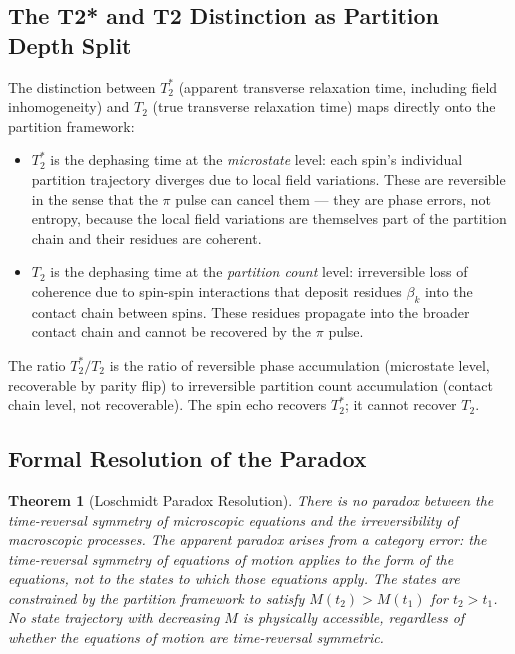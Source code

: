 \documentclass[11pt,twocolumn,a4paper]{article}
\theoremstyle{plain}
\newtheorem{theorem}{Theorem}[section]
\theoremstyle{definition}
\theoremstyle{remark}
\begin{document}
\subsection{The T2* and T2 Distinction as Partition Depth Split}
\label{subsec:T2_split}

The distinction between $T_2^*$ (apparent transverse relaxation time, including
field inhomogeneity) and $T_2$ (true transverse relaxation time) maps directly
onto the partition framework:

\begin{itemize}
    \item $T_2^*$ is the dephasing time at the \emph{microstate} level: each
          spin's individual partition trajectory diverges due to local field
          variations. These are reversible in the sense that the $\pi$ pulse
          can cancel them --- they are phase errors, not entropy, because the
          local field variations are themselves part of the partition chain and
          their residues are coherent.

    \item $T_2$ is the dephasing time at the \emph{partition count} level:
          irreversible loss of coherence due to spin-spin interactions that
          deposit residues $\beta_k$ into the contact chain between spins.
          These residues propagate into the broader contact chain and cannot
          be recovered by the $\pi$ pulse.
\end{itemize}

The ratio $T_2^*/T_2$ is the ratio of reversible phase accumulation (microstate
level, recoverable by parity flip) to irreversible partition count accumulation
(contact chain level, not recoverable). The spin echo recovers $T_2^*$; it
cannot recover $T_2$.

\subsection{Formal Resolution of the Paradox}
\label{subsec:formal_resolution}

\begin{theorem}[Loschmidt Paradox Resolution]
\label{thm:resolution}
There is no paradox between the time-reversal symmetry of microscopic equations
and the irreversibility of macroscopic processes. The apparent paradox arises
from a category error: the time-reversal symmetry of equations of motion applies
to the \emph{form} of the equations, not to the \emph{states} to which those
equations apply. The states are constrained by the partition framework to satisfy
$M(t_2) > M(t_1)$ for $t_2 > t_1$. No state trajectory with decreasing $M$ is
physically accessible, regardless of whether the equations of motion are
time-reversal symmetric.
\end{theorem}
\end{document}
